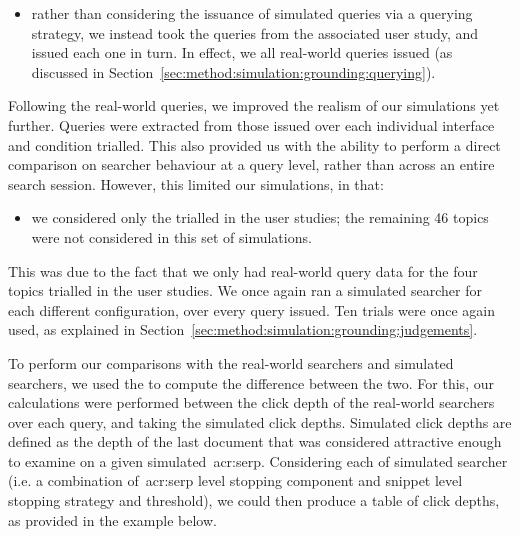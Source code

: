 \begin{itemize}
    \item{rather than considering the issuance of simulated queries via a querying strategy, we instead took the queries from the associated user study, and issued each one in turn. In effect, we  all real-world queries issued (as discussed in Section~\ref{sec:method:simulation:grounding:querying}).}
\end{itemize}

Following the real-world queries, we improved the realism of our simulations yet further. Queries were extracted from those issued over each individual interface and condition trialled. This also provided us with the ability to perform a direct comparison on searcher behaviour at a query level, rather than across an entire search session. However, this limited our simulations, in that:

\begin{itemize}
    \item{we considered only the  trialled in the user studies; the remaining 46 topics were not considered in this set of simulations.}
\end{itemize}

This was due to the fact that we only had real-world query data for the four topics trialled in the user studies. We once again ran a simulated searcher for each different configuration, over every query issued. Ten trials were once again used, as explained in Section~\ref{sec:method:simulation:grounding:judgements}.

To perform our comparisons with the real-world searchers and simulated searchers, we used the  to compute the difference between the two. For this, our calculations were performed between the click depth of the real-world searchers over each query, and taking the simulated click depths. Simulated click depths are defined as the depth of the last document that was considered attractive enough to examine on a given simulated~\gls{acr:serp}. Considering each of simulated searcher (i.e. a combination of~\gls{acr:serp} level stopping component and snippet level stopping strategy and threshold), we could then produce a table of click depths, as provided in the example below.

\begin{figure}[h]
    \centering
    \vspace*{-8mm}
\end{figure}

